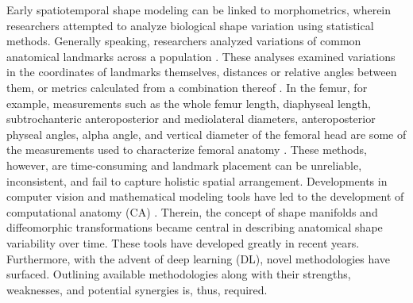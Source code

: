 	Early spatiotemporal shape modeling can be linked to morphometrics, wherein researchers attempted to analyze biological shape variation using statistical methods. Generally speaking, researchers analyzed variations of common anatomical landmarks across a population \cite{Slice2007}. These analyses examined variations in the coordinates of landmarks themselves, distances or relative angles between them, or metrics calculated from a combination thereof \cite{Rohlf90, Slice, 7e30a527-6aa0-3191-9009-c9d49643b4ef}. In the femur, for example, measurements such as the whole femur length, diaphyseal length, subtrochanteric anteroposterior and mediolateral diameters, anteroposterior physeal angles, alpha angle, and vertical diameter of the femoral head are some of the measurements used to characterize femoral anatomy \cite{Toogood2008, Wescott2005, Rissech2008}. These methods, however, are time-consuming and landmark placement can be unreliable, inconsistent, and fail to capture holistic spatial arrangement. Developments in computer vision and mathematical modeling tools have led to the development of computational anatomy (CA) \cite{Miller1997, Grenander1998, Miller2004}. Therein, the concept of shape manifolds and diffeomorphic transformations became central in describing anatomical shape variability over time. These tools have developed greatly in recent years. Furthermore, with the advent of deep learning (DL), novel methodologies have surfaced. Outlining available methodologies along with their strengths, weaknesses, and potential synergies is, thus, required. 


